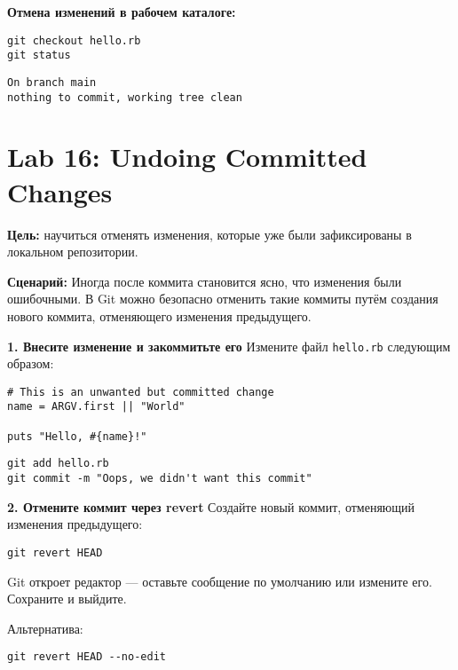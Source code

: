 \documentclass[a4paper,12pt]{report}
\begin{document}
\textbf{Отмена изменений в рабочем каталоге:}
\begin{verbatim}
git checkout hello.rb
git status
\end{verbatim}
\begin{verbatim}
On branch main
nothing to commit, working tree clean
\end{verbatim}


\section{Lab 16: Undoing Committed Changes}
\textbf{Цель:} научиться отменять изменения, которые уже были зафиксированы в локальном репозитории.

\textbf{Сценарий:}
Иногда после коммита становится ясно, что изменения были ошибочными. В Git можно безопасно отменить такие коммиты путём создания нового коммита, отменяющего изменения предыдущего.

\textbf{1. Внесите изменение и закоммитьте его}
Измените файл \texttt{hello.rb} следующим образом:
\begin{verbatim}
# This is an unwanted but committed change
name = ARGV.first || "World"

puts "Hello, #{name}!"
\end{verbatim}

\begin{verbatim}
git add hello.rb
git commit -m "Oops, we didn't want this commit"
\end{verbatim}


\textbf{2. Отмените коммит через revert}
Создайте новый коммит, отменяющий изменения предыдущего:
\begin{verbatim}
git revert HEAD
\end{verbatim}

Git откроет редактор — оставьте сообщение по умолчанию или измените его. Сохраните и выйдите.

Альтернатива:
\begin{verbatim}
git revert HEAD --no-edit
\end{verbatim}
\end{document}
